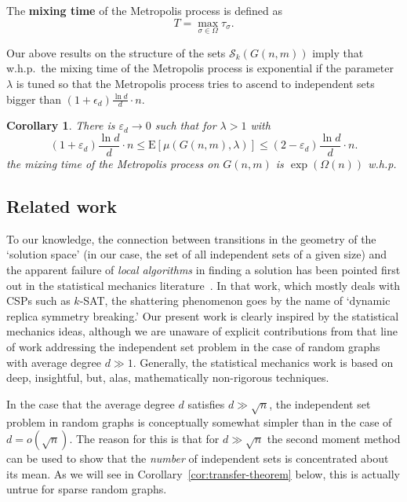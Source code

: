 \documentclass[a4paper,10pt]{article}
\newtheorem{corollary}{Corollary}\renewcommand{\thecorollary}{\arabic{corollary}}
\newcommand\cS{\mathcal{S}}
\newcommand\eps{\varepsilon}
\newcommand\Erw{\mathrm{E}}
\newcommand\ra{\rightarrow}
\newcommand\brk[1]{\left\lbrack{#1}\right\rbrack}
\newcommand{\whp}{w.h.p.}
\newcommand\Cor{Corollary}
\begin{document}
\noindent
The {\bf mixing time} of the Metropolis process  is defined as
\begin{displaymath}
T=\max_{\sigma\in \Omega}\tau_{\sigma}.
\end{displaymath}


Our above results on the structure of the sets $\cS_k(G(n,m))$
imply that \whp\ the mixing time of the Metropolis process is
exponential if the parameter $\lambda$ is tuned so that the
Metropolis process tries to ascend to independent sets bigger
than $(1+\epsilon_d)\frac{\ln d}d\cdot n$.

\begin{corollary}\label{cor:MixingTimeBound}
There is $\eps_d\ra0$ such that for $\lambda>1$ with
\begin{equation}\label{eq:themuglambda}
	(1+\eps_d)\frac{\ln d}d\cdot n\leq\Erw\brk{\mu(G(n,m),\lambda)}\leq(2-\eps_d)\frac{\ln d}d\cdot n.
\end{equation}
the mixing time of the Metropolis process on $G(n,m)$ is
$\exp(\Omega(n))$ \whp
\end{corollary}




\subsection{Related work}
To our knowledge, the connection between transitions in the geometry
of the `solution space' (in our case, the set of all independent sets of a given size)
and the  apparent failure of {\em local algorithms}
in finding a solution has been pointed first out in the statistical mechanics 
literature~\cite{FuAnderson,MPZ-Science,1RSBPaper}.
In that work, which mostly deals with CSPs such as $k$-SAT,
the shattering phenomenon goes by the name of `dynamic replica symmetry breaking.'
Our present work is clearly inspired by the statistical mechanics ideas,
although we are unaware of explicit contributions from that line of work addressing the
independent set problem in the case of random graphs with average degree $d\gg1$.
Generally, the statistical mechanics work is based on deep, insightful, but, alas, 
mathematically non-rigorous techniques.



In the case that the average degree $d$ satisfies $d\gg\sqrt n$,
the independent set problem in random graphs is conceptually
somewhat simpler than in the case of $d=o(\sqrt n)$.
The reason for this is that for $d\gg\sqrt n$
the second moment method can be used to show that the \emph{number}
of independent sets is concentrated about its mean. As we will see
in \Cor~\ref{cor:transfer-theorem} below, this is actually untrue for
sparse random graphs.
\end{document}
